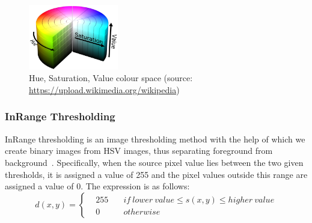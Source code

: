 \begin{figure}[htb]
    \centering
    \includegraphics[width=0.35\textwidth]{images/HSV.png}
    \caption{Hue, Saturation, Value colour space (source: \url{https://upload.wikimedia.org/wikipedia})}
    \label{fig:HSV diagram}
\end{figure}

\subsubsection{InRange Thresholding}
InRange thresholding is an image thresholding method with the help of which we create binary images from HSV images, thus separating foreground from background~\citep{Nixon2020}. Specifically, when the source pixel value lies between the two given thresholds, it is assigned a value of 255 and the pixel values outside this range are assigned a value of 0. The expression is as follows:
\begin{equation}
    d(x, y) = \left\{\begin{matrix}
    &255& \quad if\ lower\ value\le s(x, y)\le higher\ value \\
    &0& \quad otherwise
    \end{matrix}\right.
\end{equation}




